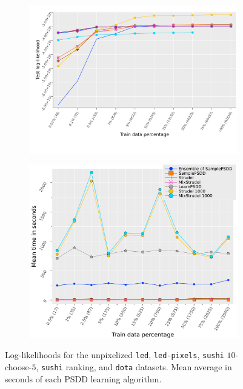 \begin{figure}
\begin{subfigure}[t]{0.495\textwidth}
    \centering\includegraphics[width=\textwidth]{supplementary/all_ll_dota_ensembles.pdf}
    \caption{}
  \end{subfigure}
  \begin{subfigure}[t]{0.495\textwidth}
    \centering\includegraphics[width=0.9\columnwidth]{supplementary/all_sushi_time.pdf}
    \caption{}
  \end{subfigure}
  \caption{ Log-likelihoods for the unpixelized \texttt{led}, 
    \texttt{led-pixels},  \texttt{sushi} $10$-choose-$5$, 
    \texttt{sushi} ranking, and  \texttt{dota} datasets.  Mean
    average in seconds of each PSDD learning algorithm.}
  \label{fig:performance}
\end{figure}

